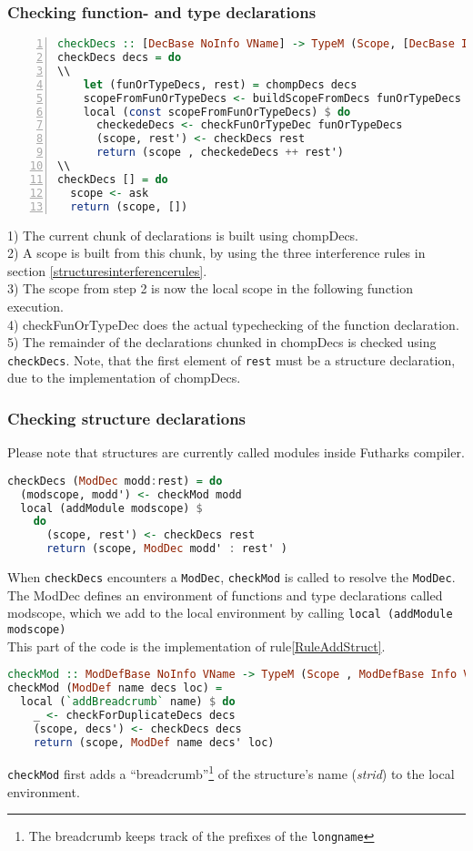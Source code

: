 \subsubsection{Checking function- and type declarations \label{subsec:checkfunortype}}
\begin{lstlisting}[language=Haskell, numbers=left]
checkDecs :: [DecBase NoInfo VName] -> TypeM (Scope, [DecBase Info VName])
checkDecs decs = do
\\
    let (funOrTypeDecs, rest) = chompDecs decs
    scopeFromFunOrTypeDecs <- buildScopeFromDecs funOrTypeDecs
    local (const scopeFromFunOrTypeDecs) $ do
      checkedeDecs <- checkFunOrTypeDec funOrTypeDecs
      (scope, rest') <- checkDecs rest
      return (scope , checkedeDecs ++ rest')
\\
checkDecs [] = do
  scope <- ask
  return (scope, [])
\end{lstlisting}
1) The current chunk of declarations is built using chompDecs. \\
2) A scope is built from this chunk, by using the three interference rules in
section \ref{structuresinterferencerules}.\\
3) The scope from step 2 is now the local scope in the following function
execution.\\
4) checkFunOrTypeDec does the actual typechecking of the function declaration. \\
5) The remainder of the declarations chunked in chompDecs is checked using
\texttt{checkDecs}. Note, that the first element of \texttt{rest} must be a structure
declaration, due to the implementation of chompDecs.\\
\subsubsection{Checking structure declarations\label{checkingstructuredeclarations}}
Please note that structures are currently called modules inside Futharks compiler.
\begin{lstlisting}[language=Haskell]
checkDecs (ModDec modd:rest) = do
  (modscope, modd') <- checkMod modd
  local (addModule modscope) $
    do
      (scope, rest') <- checkDecs rest
      return (scope, ModDec modd' : rest' )
\end{lstlisting}
When \texttt{checkDecs} encounters a \texttt{ModDec}, \texttt{checkMod} is called to resolve the \texttt{ModDec}.
The ModDec defines an environment of functions and type declarations called
modscope, which we add to the local environment by calling \texttt{local
  (addModule modscope)}\\
This part of the code is the implementation of rule\ref{RuleAddStruct}.
\begin{lstlisting}[language=Haskell]
checkMod :: ModDefBase NoInfo VName -> TypeM (Scope , ModDefBase Info VName)
checkMod (ModDef name decs loc) =
  local (`addBreadcrumb` name) $ do
    _ <- checkForDuplicateDecs decs
    (scope, decs') <- checkDecs decs
    return (scope, ModDef name decs' loc)
\end{lstlisting}
\texttt{checkMod} first adds a ``breadcrumb''\footnote{The breadcrumb keeps track of the prefixes of the \texttt{longname}} of the structure's name (\textit{strid}) to
the local environment. 

